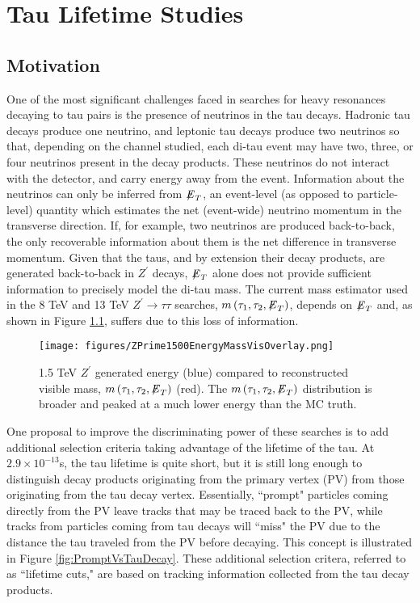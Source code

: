 \chapter{Tau Lifetime Studies}

\section{Motivation}

One of the most significant challenges faced in searches for heavy resonances decaying to tau pairs is the presence of neutrinos in the tau decays. Hadronic tau decays produce one neutrino, and leptonic tau decays produce two neutrinos so that, depending on the channel studied, each di-tau event may have two, three, or four neutrinos present in the decay products. These neutrinos do not interact with the detector, and carry energy away from the event. Information about the neutrinos can only be inferred from ${\not\mathrel{E}}_T$, an event-level (as opposed to particle-level) quantity which estimates the net (event-wide) neutrino momentum in the transverse direction. If, for example, two neutrinos are produced back-to-back, the only recoverable information about them is the net difference in transverse momentum. Given that the taus, and by extension their decay products, are generated back-to-back in $Z^\prime$ decays, ${\not\mathrel{E}}_T$ alone does not provide sufficient information to precisely model the di-tau mass. The current mass estimator used in the 8 TeV and 13 TeV $Z^\prime\to\tau\tau$ searches, $m\left(\tau_1, \tau_2, {\not\mathrel{E}}_T\right)$, depends on ${\not\mathrel{E}}_T$ and, as shown in Figure \ref{fig:massVisSigVsMC}, suffers due to this loss of information.

\begin{figure}[tbh!]
\centering
\texttt{[image: figures/ZPrime1500EnergyMassVisOverlay.png]}
\caption{1.5 TeV $Z^\prime$ generated energy (blue) compared to reconstructed visible mass, $m\left(\tau_1, \tau_2, {\not\mathrel{E}}_T\right)$ (red). The $m\left(\tau_1, \tau_2, {\not\mathrel{E}}_T\right)$ distribution is broader and peaked at a much lower energy than the MC truth.}
\label{fig:massVisSigVsMC}
\end{figure}

One proposal to improve the discriminating power of these searches is to add additional selection criteria taking advantage of the lifetime of the tau. At $2.9\times 10^{-13}$s, the tau lifetime is quite short, but it is still long enough to distinguish decay products originating from the primary vertex (PV) from those originating from the tau decay vertex. Essentially, ``prompt" particles coming directly from the PV leave tracks that may be traced back to the PV, while tracks from particles coming from tau decays will ``miss" the PV due to the distance the tau traveled from the PV before decaying. This concept is illustrated in Figure \ref{fig:PromptVsTauDecay}. These additional selection critera, referred to as ``lifetime cuts," are based on tracking information collected from the tau decay products.

